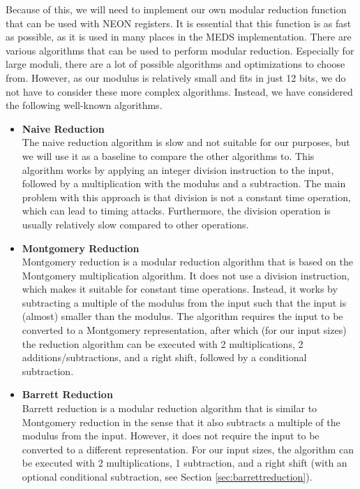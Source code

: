 \documentclass[11pt,a4paper]{report}
\theoremstyle{definition}
\begin{document}
Because of this, we will need to implement our own modular reduction function that can be used with NEON registers. It is essential that this function is as fast as possible, as it is used in many places in the MEDS implementation. There are various algorithms that can be used to perform modular reduction. Especially for large moduli, there are a lot of possible algorithms and optimizations to choose from. However, as our modulus is relatively small and fits in just 12 bits, we do not have to consider these more complex algorithms. Instead, we have considered the following well-known algorithms.
\begin{itemize}
  \item \textbf{Naive Reduction}\\
  The naive reduction algorithm is slow and not suitable for our purposes, but we will use it as a baseline to compare the other algorithms to. This algorithm works by applying an integer division instruction to the input, followed by a multiplication with the modulus and a subtraction. The main problem with this approach is that division is not a constant time operation, which can lead to timing attacks. Furthermore, the division operation is usually relatively slow compared to other operations.
  \item \textbf{Montgomery Reduction}\\
  Montgomery reduction \cite{montgomery1985modular} is a modular reduction algorithm that is based on the Montgomery multiplication algorithm. It does not use a division instruction, which makes it suitable for constant time operations. Instead, it works by subtracting a multiple of the modulus from the input such that the input is (almost) smaller than the modulus. The algorithm requires the input to be converted to a Montgomery representation, after which (for our input sizes) the reduction algorithm can be executed with 2 multiplications, 2 additions/subtractions, and a right shift, followed by a conditional subtraction.
  \item \textbf{Barrett Reduction}\\
  Barrett reduction\cite{barrett1986implementing} is a modular reduction algorithm that is similar to Montgomery reduction in the sense that it also subtracts a multiple of the modulus from the input. However, it does not require the input to be converted to a different representation. For our input sizes, the algorithm can be executed with 2 multiplications, 1 subtraction, and a right shift (with an optional conditional subtraction, see Section \ref{sec:barrettreduction}).
\end{itemize}
\end{document}
